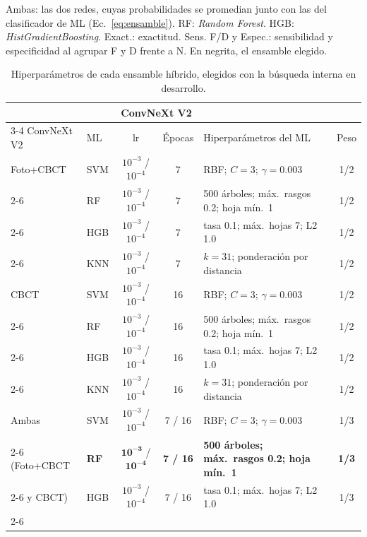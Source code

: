 \documentclass[runningheads]{llncs}
\begin{document}
\begin{table}[!t]
\par\smallskip
\parbox{\textwidth}{\scriptsize Ambas: las dos redes, cuyas probabilidades
se promedian junto con las del clasificador de ML (Ec.~\ref{eq:ensamble}). RF: \textit{Random Forest}. HGB: \textit{HistGradientBoosting}.
Exact.: exactitud. Sens. F/D y Espec.: sensibilidad y especificidad al
agrupar F y D frente a N. En negrita, el ensamble elegido.}
\par\vspace{4pt}
\caption{Hiperparámetros de cada ensamble híbrido, elegidos con la
búsqueda interna en desarrollo.}
\label{tab:hiperparametros}
\scriptsize
\setlength{\tabcolsep}{2pt}
\renewcommand{\arraystretch}{1.25}
\begin{tabular}{l|l|c|c|l|c}
\toprule
\multicolumn{2}{l|}{} & \multicolumn{2}{c|}{ConvNeXt V2} & & \\
\cline{3-4}
ConvNeXt V2 & ML & lr & Épocas & Hiperparámetros del ML & Peso \\
\midrule
Foto+CBCT & SVM & $10^{-3}$ / $10^{-4}$ & 7 & RBF; $C = 3$; $\gamma = 0.003$ & 1/2 \\ \cline{2-6}
          & RF  & $10^{-3}$ / $10^{-4}$ & 7 & 500 árboles; máx.\ rasgos 0.2; hoja mín.\ 1 & 1/2 \\ \cline{2-6}
          & HGB & $10^{-3}$ / $10^{-4}$ & 7 & tasa 0.1; máx.\ hojas 7; L2 1.0 & 1/2 \\ \cline{2-6}
          & KNN & $10^{-3}$ / $10^{-4}$ & 7 & $k = 31$; ponderación por distancia & 1/2 \\
\midrule
CBCT      & SVM & $10^{-3}$ / $10^{-4}$ & 16 & RBF; $C = 3$; $\gamma = 0.003$ & 1/2 \\ \cline{2-6}
          & RF  & $10^{-3}$ / $10^{-4}$ & 16 & 500 árboles; máx.\ rasgos 0.2; hoja mín.\ 1 & 1/2 \\ \cline{2-6}
          & HGB & $10^{-3}$ / $10^{-4}$ & 16 & tasa 0.1; máx.\ hojas 7; L2 1.0 & 1/2 \\ \cline{2-6}
          & KNN & $10^{-3}$ / $10^{-4}$ & 16 & $k = 31$; ponderación por distancia & 1/2 \\
\midrule
Ambas     & SVM & $10^{-3}$ / $10^{-4}$ & 7 / 16 & RBF; $C = 3$; $\gamma = 0.003$ & 1/3 \\ \cline{2-6}
(Foto+CBCT & \textbf{RF} & $\mathbf{10^{-3}}$ / $\mathbf{10^{-4}}$ & \textbf{7 / 16} & \textbf{500 árboles; máx.\ rasgos 0.2; hoja mín.\ 1} & \textbf{1/3} \\ \cline{2-6}
y CBCT)   & HGB & $10^{-3}$ / $10^{-4}$ & 7 / 16 & tasa 0.1; máx.\ hojas 7; L2 1.0 & 1/3 \\ \cline{2-6}

\end{tabular}
\end{table}
\end{document}
